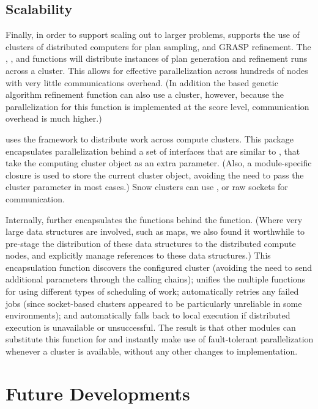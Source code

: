 \documentclass[article]{JSSstyle/jss}
\begin{document}
\subsection{Scalability}

Finally, in order to support scaling out to larger problems,  supports the use of clusters of distributed 
computers for plan sampling, and GRASP refinement. The , , and  
functions will distribute instances of plan generation and refinement runs across a cluster. This allows for effective 
parallelization across hundreds of nodes with very little communications overhead. (In addition the  based genetic 
algorithm refinement function can also use a cluster, however, because the parallelization for this function 
is implemented at the score level, communication overhead is much higher.)

 uses the  \citep{Tierney07} framework to distribute work across compute clusters. This package 
encapsulates parallelization behind a set of interfaces that are similar to , that take the computing cluster object as an extra parameter. (Also, a module-specific closure is used to store the current cluster object, avoiding the need to pass the cluster parameter in most cases.) Snow clusters can use  ,  or raw sockets for communication. 

Internally,  further encapsulates the   functions behind  the  function. 
(Where very large data structures are involved, such as maps, we also found it worthwhile 
to pre-stage the distribution of these data structures to the distributed compute nodes, and explicitly manage references to these data structures.) 
This encapsulation function discovers the configured cluster (avoiding the need to send additional parameters through the calling chains); 
unifies the multiple  functions for using different types of scheduling of work;  automatically retries any failed jobs 
(since socket-based clusters appeared to be particularly unreliable in some environments); and automatically falls back to local execution if distributed 
execution is unavailable or unsuccessful. The result is that other  modules can substitute this function for 
 and instantly make use of fault-tolerant parallelization whenever a cluster is available, 
without any other changes to implementation.

\section{Future Developments}
\end{document}

